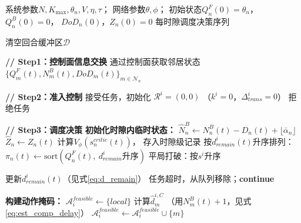 \documentclass[a4paper,11pt]{article}
\begin{document}
\begin{algorithm}[t]
\caption{基于Lyapunov-MAPPO的星间调度（系统执行层）}
\label{alg:execution}
\begin{algorithmic}[1]
\REQUIRE 系统参数$N, K_{\max}, \theta_n, V, \eta, \tau$；
         网络参数$\theta, \phi$；
         初始状态$Q^F_n(0)=\theta_n$，$Q^B_n(0)=0$，
         $DoD_n(0)$，$Z_n(0)=0$
\ENSURE 每时隙调度决策序列

    \STATE 清空回合缓冲区$\mathcal{D}$

        \STATE \textbf{// Step1：控制面信息交换}
            \STATE 通过控制面获取邻居状态
                   $\{Q^F_m(t), N^B_m(t), DoD_m(t)\}_{m \in \mathcal{N}_n}$
        \ENDFOR

        \STATE \textbf{// Step2：准入控制}
                    \STATE 接受任务，初始化
                           $\mathcal{R}^i = (0, 0)$
                           （$k^i=0$，$\Delta^i_{trans}=0$）
                \ELSE
                    \STATE 拒绝任务
                \ENDIF
            \ENDFOR
        \ENDFOR

        \STATE \textbf{// Step3：调度决策}
            \STATE \textbf{初始化时隙内临时状态：}
            \STATE $\hat{N}^B_n \leftarrow N^B_n(t)
                   - D_n(t) + \lfloor\bar{\alpha}_n\rfloor$
            \STATE $\hat{Z}_n \leftarrow Z_n(t)$
            \STATE 计算$V_\phi(s^{critic}_n(t))$，
                   存入时隙级记录
            \STATE 按$d^i_{remain}(t)$升序排列：
                   $\pi_n(t) \leftarrow
                   \text{sort}(Q^F_n(t),\ d^i_{remain}\text{升序})$
            \STATE 平局打破：按$s^i$升序

                \STATE 更新$d^i_{remain}(t)$（见式\eqref{eq:d_remain}）
                    \STATE 任务超时，从队列移除；\textbf{continue}
                \ENDIF

                \STATE \textbf{构建动作掩码：}
                \STATE $\mathcal{A}^{feasible}_i \leftarrow \{local\}$
                        \STATE 计算$\hat{d}^{i,C}_m$
                               （用$N^B_m(t)+1$，见式\eqref{eq:est_comp_delay}）
                            \STATE $\mathcal{A}^{feasible}_i \leftarrow
                                   \mathcal{A}^{feasible}_i \cup \{m\}$
                        \ENDIF
                    \ENDIF
                \ENDFOR


\end{algorithmic}
\end{algorithm}
\end{document}
